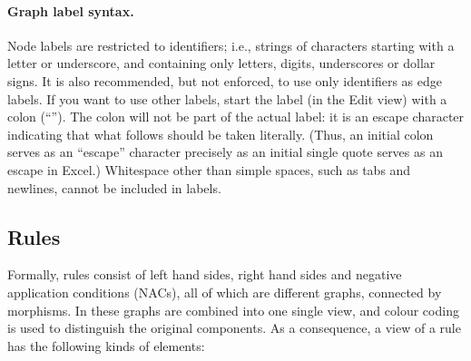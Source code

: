 \paragraph{Graph label syntax.}

Node labels are restricted to identifiers; i.e., strings of characters starting
with a letter or underscore, and containing only letters, digits, underscores
or dollar signs. It is also recommended, but not enforced, to use only
identifiers as edge labels. If you want to use other labels, start the label
(in the Edit view) with a colon (``\lab{:}''). The colon will not be part of
the actual label: it is an escape character indicating that what follows should
be taken literally. (Thus, an initial colon serves as an ``escape'' character
precisely as an initial single quote serves as an escape in Excel.) Whitespace
other than simple spaces, such as tabs and newlines, cannot be included in
labels.

\subsection{Rules}

Formally, rules consist of left hand sides, right hand sides and negative
application conditions (NACs), all of which are different graphs, connected by
morphisms. In \GROOVE{} these graphs are combined into one single view, and
colour coding is used to distinguish the original components. As a consequence,
a \GROOVE{} view of a rule has the following kinds of elements:


